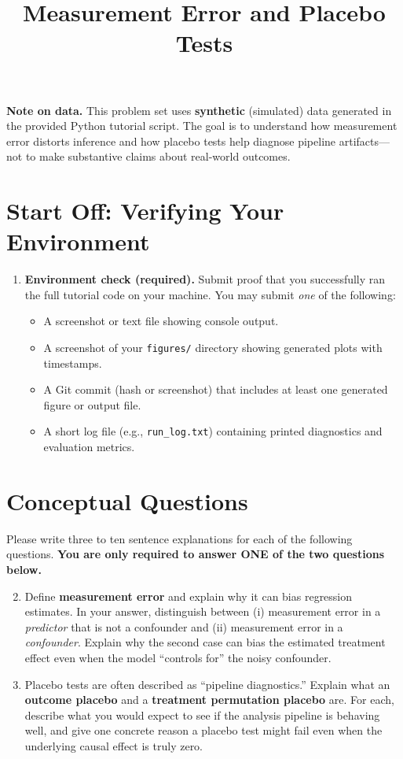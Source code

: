 \documentclass[11pt]{article}
\title{ Measurement Error and Placebo Tests}
\author{ }
\date{ }
\begin{document}
\maketitle

\noindent \textbf{Note on data.} This problem set uses \textbf{synthetic} (simulated) data generated in the provided Python tutorial script. The goal is to understand how measurement error distorts inference and how placebo tests help diagnose pipeline artifacts---not to make substantive claims about real-world outcomes.

\section*{Start Off: Verifying Your Environment}

\begin{enumerate}
\item \textbf{Environment check (required).}  
Submit proof that you successfully ran the full tutorial code on your machine. You may submit \emph{one} of the following:
\begin{itemize}
  \item A screenshot or text file showing console output.
  \item A screenshot of your \texttt{figures/} directory showing generated plots with timestamps.
  \item A Git commit (hash or screenshot) that includes at least one generated figure or output file.
  \item A short log file (e.g., \texttt{run\_log.txt}) containing printed diagnostics and evaluation metrics.
\end{itemize}
\end{enumerate}

\section*{Conceptual Questions}
Please write three to ten sentence explanations for each of the following questions. \textbf{You are only required to answer ONE of the two questions below.} \bigskip
 
\begin{enumerate}
\setcounter{enumi}{1}

\item Define \textbf{measurement error} and explain why it can bias regression estimates. In your answer, distinguish between (i) measurement error in a \emph{predictor} that is not a confounder and (ii) measurement error in a \emph{confounder}. Explain why the second case can bias the estimated treatment effect even when the model ``controls for'' the noisy confounder.

\item Placebo tests are often described as ``pipeline diagnostics.'' Explain what an \textbf{outcome placebo} and a \textbf{treatment permutation placebo} are. For each, describe what you would expect to see if the analysis pipeline is behaving well, and give one concrete reason a placebo test might fail even when the underlying causal effect is truly zero.

  \end{enumerate}
\end{document}
